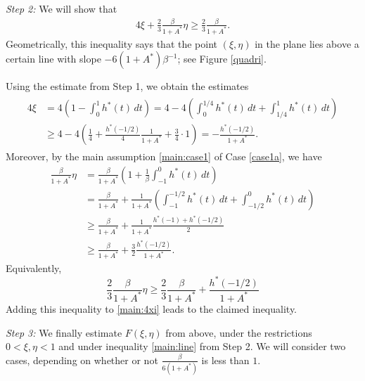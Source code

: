 \documentclass{amsart}
\theoremstyle{plain}
\theoremstyle{definition}
\theoremstyle{remark}
\numberwithin{equation}{section}
\numberwithin{theorem}{section}
\numberwithin{conjecture}{section}
\newcommand{\1}{\mathbf 1}
\begin{document}
\bigskip
\noindent
\textit{Step 2:} We will show that
\begin{align}\label{main:line}
4\xi + \frac{2}{3}\frac{\beta}{1+A^*}\eta \ge \frac{2}{3}\frac{\beta}{1+A^*}.
\end{align}
Geometrically, this inequality says that the point $(\xi,\eta)$ in the plane lies above a certain line with slope $-6(1+A^*)\beta^{-1}$; see Figure \ref{quadri}.

Using the estimate from Step 1, we obtain the estimates
\begin{align}
\begin{aligned}\label{main:4xi}
4\xi&=4\left(1-\int_0^1 h^*(t)\,dt \right)=4-4\left( \int_0^{1/4} h^*(t)\,dt+\int_{1/4}^1 h^*(t)\,dt\right)  \\
&\ge 4-4\left( \frac{1}{4}+\frac{h^*(-1/2)}{4}\frac{1}{1+A^*}+\frac{3}{4}\cdot 1 \right)=-\frac{h^*(-1/2)}{1+A^*}.
\end{aligned}
\end{align}
Moreover, by the main assumption \eqref{main:case1} of Case \ref{case1a}, we have
\begin{align*}
\frac{\beta}{1+A^*}\eta&=\frac{\beta}{1+A^*}\left(1+\frac{1}{\beta}\int_{-1}^0 h^*(t)\,dt \right) \\
&=\frac{\beta}{1+A^*}+\frac{1}{1+A^*}\left(\int_{-1}^{-1/2} h^*(t)\,dt+\int_{-1/2}^0 h^*(t)\,dt\right) \\
&\ge \frac{\beta}{1+A^*}+\frac{1}{1+A^*} \frac{h^*(-1)+h^*(-1/2)}{2}  \\
&\ge \frac{\beta}{1+A^*}+\frac{3}{2} \frac{h^*(-1/2)}{1+A^*}.
\end{align*}
Equivalently, 
$$\frac{2}{3}\frac{\beta}{1+A^*}\eta \geq \frac{2}{3}\frac{\beta}{1+A^*}+ \frac{h^*(-1/2)}{1+A^*}$$
Adding this inequality to \eqref{main:4xi} leads to the claimed inequality.

\bigskip
\noindent
\textit{Step 3:} We finally estimate $F(\xi,\eta)$ from above, under the restrictions $0<\xi,\eta<1$ and under inequality  \eqref{main:line} from Step 2. We will consider two cases, depending on whether or not $\frac{\beta}{6(1+A^*)}$ is less than $1$.
\end{document}

